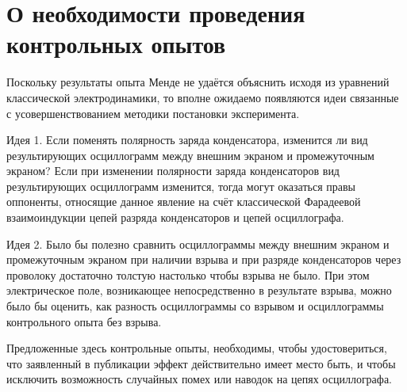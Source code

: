 \documentclass[12pt]{article}
\begin{document}
 
 


\section{О необходимости проведения контрольных опытов}

Поскольку результаты опыта Менде не удаётся объяснить исходя из уравнений классической электродинамики, то вполне ожидаемо появляются идеи связанные с усовершенствованием методики постановки эксперимента.

Идея 1. Если поменять полярность заряда конденсатора, изменится ли вид результирующих осциллограмм между внешним экраном и промежуточным экраном? Если при изменении полярности заряда конденсаторов вид результирующих осциллограмм изменится, тогда могут оказаться правы оппоненты, относящие данное явление на счёт классической Фарадеевой взаимоиндукции цепей разряда конденсаторов и цепей осциллографа.

Идея 2. Было бы полезно сравнить осциллограммы между внешним экраном и промежуточным экраном при наличии взрыва и при разряде конденсаторов через проволоку достаточно толстую настолько чтобы взрыва не было. При этом электрическое поле, возникающее непосредственно в результате взрыва, можно было бы оценить, как разность осциллограммы со взрывом и осциллограммы контрольного опыта без взрыва.

Предложенные здесь контрольные опыты, необходимы, чтобы удостовериться, что заявленный в публикации \cite{Mende2015} эффект действительно имеет место быть, и чтобы исключить возможность случайных помех или наводок на цепях осциллографа.
\end{document}
